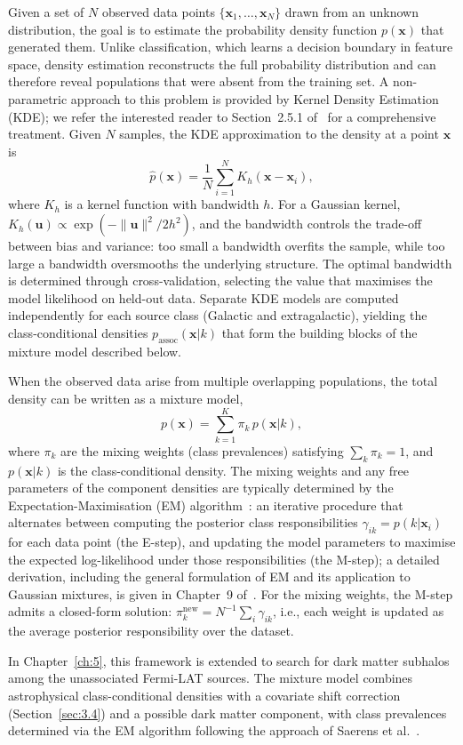 Given a set of $N$ observed data points $\{\mathbf{x}_1, \ldots, \mathbf{x}_N\}$ drawn from an unknown distribution, the goal is to estimate the probability density function $p(\mathbf{x})$ that generated them.
Unlike classification, which learns a decision boundary in feature space, density estimation reconstructs the full probability distribution and can therefore reveal populations that were absent from the training set.
A non-parametric approach to this problem is provided by Kernel Density Estimation (KDE); we refer the interested reader to Section~2.5.1 of~\cite{bishop} for a comprehensive treatment.
Given $N$ samples, the KDE approximation to the density at a point $\mathbf{x}$ is
\begin{equation}
	\hat{p}(\mathbf{x}) = \frac{1}{N} \sum_{i=1}^{N} K_h(\mathbf{x} - \mathbf{x}_i),
	\label{eq:kde}
\end{equation}
where $K_h$ is a kernel function with bandwidth $h$.
For a Gaussian kernel, $K_h(\mathbf{u}) \propto \exp(-\|\mathbf{u}\|^2 / 2h^2)$, and the bandwidth controls the trade-off between bias and variance: too small a bandwidth overfits the sample, while too large a bandwidth oversmooths the underlying structure.
The optimal bandwidth is determined through cross-validation, selecting the value that maximises the model likelihood on held-out data.
Separate KDE models are computed independently for each source class (Galactic and extragalactic), yielding the class-conditional densities $p_\mathrm{assoc}(\mathbf{x}|k)$ that form the building blocks of the mixture model described below.

When the observed data arise from multiple overlapping populations, the total density can be written as a mixture model,
\begin{equation}
	p(\mathbf{x}) = \sum_{k=1}^{K} \pi_k \, p(\mathbf{x}|k),
	\label{eq:mixture_model}
\end{equation}
where $\pi_k$ are the mixing weights (class prevalences) satisfying $\sum_k \pi_k = 1$, and $p(\mathbf{x}|k)$ is the class-conditional density.
The mixing weights and any free parameters of the component densities are typically determined by the Expectation-Maximisation (EM) algorithm~\cite{Dempster:1977}: an iterative procedure that alternates between computing the posterior class responsibilities $\gamma_{ik} = p(k | \mathbf{x}_i)$ for each data point (the E-step), and updating the model parameters to maximise the expected log-likelihood under those responsibilities (the M-step); a detailed derivation, including the general formulation of EM and its application to Gaussian mixtures, is given in Chapter~9 of~\cite{bishop}.
For the mixing weights, the M-step admits a closed-form solution: $\pi_k^\mathrm{new} = N^{-1}\sum_i \gamma_{ik}$, i.e., each weight is updated as the average posterior responsibility over the dataset.

In Chapter~\ref{ch:5}, this framework is extended to search for dark matter subhalos among the unassociated Fermi-LAT sources.
The mixture model combines astrophysical class-conditional densities with a covariate shift correction (Section~\ref{sec:3.4}) and a possible dark matter component, with class prevalences determined via the EM algorithm following the approach of Saerens et al.~\cite{10.1162/089976602753284446_Saerens}.
